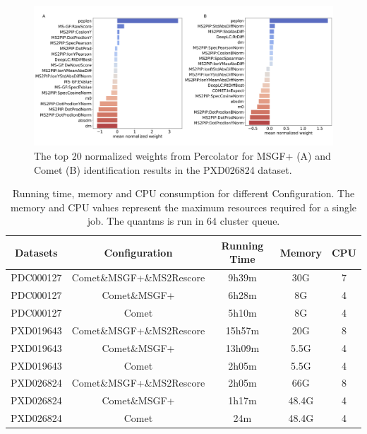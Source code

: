 \documentclass[12pt]{article}
\begin{document}
\begin{figure}[ht!]
	\centering
	\includegraphics[width=1\textwidth]{figures//phos_weights.png}
	\caption{The top 20 normalized weights from Percolator for MSGF+ (A) and Comet (B) identification results in the PXD026824 dataset.}
	\label{fig:phospho_features}
\end{figure}


\renewcommand\thetable{S\arabic{table}}
\setcounter{table}{0}

\begin{table}[h!]
	\centering
	\caption{Running time, memory and CPU consumption for different Configuration. The memory and CPU values represent the maximum resources required for a single job. The quantms is run in 64 cluster queue.}
	\begin{tabular}{|c|c|c|c|c|}
		\hline
		Datasets & Configuration & Running Time & Memory & CPU \\
		\hline
		PDC000127 & Comet\&MSGF+\&MS2Rescore & 9h39m & 30G & 7 \\
		PDC000127 & Comet\&MSGF+ & 6h28m & 8G & 4 \\
		PDC000127 & Comet & 5h10m & 8G & 4 \\
		PXD019643 & Comet\&MSGF+\&MS2Rescore & 15h57m & 20G & 8 \\
		PXD019643 & Comet\&MSGF+ & 13h09m & 5.5G & 4 \\
		PXD019643 & Comet & 2h05m & 5.5G & 4 \\
		PXD026824 & Comet\&MSGF+\&MS2Rescore & 2h05m & 66G & 8 \\
		PXD026824 & Comet\&MSGF+ & 1h17m & 48.4G & 4 \\
		PXD026824 & Comet & 24m & 48.4G & 4 \\
		\hline
	\end{tabular}
	\label{tab:resources_stats}
\end{table}
\end{document}
